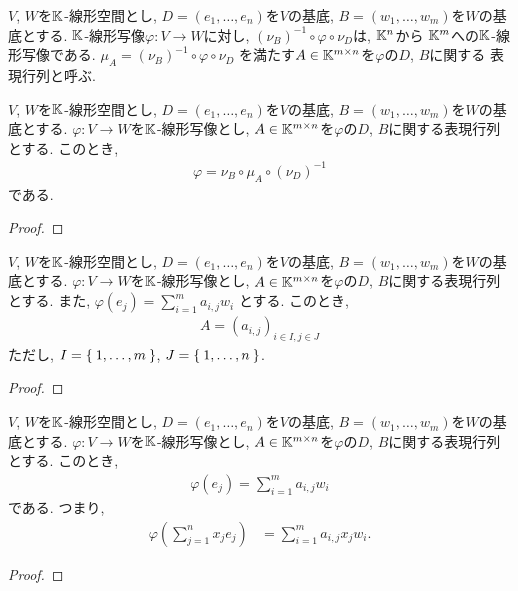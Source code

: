 \begin{definition}
  $V$, $W$を$\mathbb{K}$-線形空間とし,
  $D=(e_1,\ldots,e_n)$を$V$の基底,
  $B=(w_1,\ldots,w_m)$を$W$の基底とする.
  $\mathbb{K}$-線形写像$\varphi\colon V\to W$に対し,
  $(\nu_B)^{-1}\circ \varphi\circ \nu_D$は,
  $\mathbb{K}^n$から $\mathbb{K}^m$への$\mathbb{K}$-線形写像である.
  $\mu_A=(\nu_B)^{-1}\circ \varphi\circ \nu_D$
  を満たす$A\in\mathbb{K}^{m\times n}$を$\varphi$の$D$, $B$に関する
  表現行列と呼ぶ.
\end{definition}
\begin{prop}
  $V$, $W$を$\mathbb{K}$-線形空間とし,
  $D=(e_1,\ldots,e_n)$を$V$の基底,
  $B=(w_1,\ldots,w_m)$を$W$の基底とする.
  $\varphi\colon V\to W$を$\mathbb{K}$-線形写像とし,
  $A\in\mathbb{K}^{m\times n}$を$\varphi$の$D$, $B$に関する表現行列とする.
このとき,
\begin{align*}
  \varphi=\nu_B\circ \mu_A\circ (\nu_{D})^{-1}
\end{align*}
である.
\end{prop}
\begin{proof}\end{proof}

\begin{prop}
  $V$, $W$を$\mathbb{K}$-線形空間とし,
  $D=(e_1,\ldots,e_n)$を$V$の基底,
  $B=(w_1,\ldots,w_m)$を$W$の基底とする.
  $\varphi\colon V\to W$を$\mathbb{K}$-線形写像とし,
  $A\in\mathbb{K}^{m\times n}$を$\varphi$の$D$, $B$に関する表現行列とする.
  また,
  $\varphi(e_j)=\sum_{i=1}^m a_{i,j} w_i$
  とする.
  このとき,
\begin{align*}
  A=(a_{i,j})_{i\in I, j\in J}
\end{align*}
ただし,
$I=\Set{1,\ldots,m}$,
$J=\Set{1,\ldots,n}$.
\end{prop}
\begin{proof}\end{proof}


\begin{prop}
  $V$, $W$を$\mathbb{K}$-線形空間とし,
  $D=(e_1,\ldots,e_n)$を$V$の基底,
  $B=(w_1,\ldots,w_m)$を$W$の基底とする.
  $\varphi\colon V\to W$を$\mathbb{K}$-線形写像とし,
  $A\in\mathbb{K}^{m\times n}$を$\varphi$の$D$, $B$に関する表現行列とする.
このとき,
\begin{align*}
  \varphi(e_j)=\sum_{i=1}^m a_{i,j}w_i
\end{align*}
である.
つまり,
\begin{align*}
  \varphi(\sum_{j=1}^n x_j e_j)
  &=\sum_{i=1}^m a_{i,j}x_jw_i.
\end{align*}
\end{prop}
\begin{proof}\end{proof}


